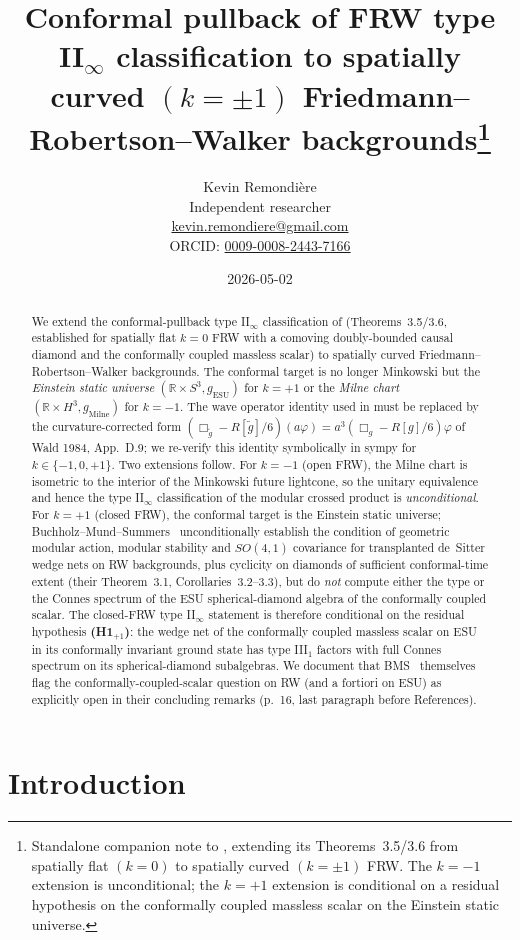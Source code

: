\documentclass[11pt]{article}
\title{Conformal pullback of FRW type II$_\infty$ classification to spatially
curved $(k=\pm 1)$ Friedmann--Robertson--Walker
backgrounds\thanks{Standalone companion note to \cite{Remondiere2026}, extending
its Theorems~3.5/3.6 from spatially flat $(k=0)$ to spatially curved
$(k=\pm 1)$ FRW. The $k=-1$ extension is unconditional; the $k=+1$ extension is
conditional on a residual hypothesis on the conformally coupled massless scalar
on the Einstein static universe.}}
\author{Kevin Remondi\`ere\\
\small Independent researcher\\
\small \href{mailto:kevin.remondiere@gmail.com}{kevin.remondiere@gmail.com}\\
\small ORCID: \href{https://orcid.org/0009-0008-2443-7166}{0009-0008-2443-7166}}
\date{2026-05-02}
\theoremstyle{definition}
\newcommand{\R}{\mathbb{R}}
\newcommand{\ESU}{\mathrm{ESU}}
\newcommand{\Milne}{\mathrm{Milne}}
\begin{document}
\maketitle

\begin{abstract}
We extend the conformal-pullback type II$_\infty$ classification of
\cite{Remondiere2026} (Theorems~3.5/3.6, established for spatially flat
$k=0$ FRW with a comoving doubly-bounded causal diamond and the conformally
coupled massless scalar) to spatially curved Friedmann--Robertson--Walker
backgrounds. The conformal target is no longer Minkowski but the
\emph{Einstein static universe} $(\R\times S^3,g_\ESU)$ for $k=+1$ or the
\emph{Milne chart} $(\R\times H^3,g_\Milne)$ for $k=-1$. The wave operator
identity used in \cite{Remondiere2026} must be replaced by the curvature-corrected
form $(\Box_{\tilde g}-R[\tilde g]/6)(a\varphi)=a^3(\Box_g-R[g]/6)\varphi$
of Wald 1984, App.~D.9; we re-verify this identity symbolically in sympy
for $k\in\{-1,0,+1\}$. Two extensions follow.
For $k=-1$ (open FRW), the Milne chart is isometric to the interior of the
Minkowski future lightcone, so the unitary equivalence and hence the type
II$_\infty$ classification of the modular crossed product is
\emph{unconditional}. For $k=+1$ (closed FRW), the conformal target is the
Einstein static universe; Buchholz--Mund--Summers~\cite{BMS2000}
unconditionally establish the condition of geometric modular action,
modular stability and $SO(4,1)$ covariance for transplanted
de~Sitter wedge nets on RW backgrounds, plus cyclicity on diamonds of
sufficient conformal-time extent (their Theorem~3.1, Corollaries~3.2--3.3),
but do \emph{not} compute either the type or the Connes spectrum of the
ESU spherical-diamond algebra of the conformally coupled scalar. The closed-FRW
type II$_\infty$ statement is therefore conditional on the residual hypothesis
\textbf{(H1$_{+1}$)}: the wedge net of the conformally coupled massless scalar on
ESU in its conformally invariant ground state has type III$_1$ factors with
full Connes spectrum on its spherical-diamond subalgebras. We document that
BMS~\cite{BMS2000} themselves flag the conformally-coupled-scalar question on
RW (and a fortiori on ESU) as explicitly open in their concluding remarks
(p.~16, last paragraph before References).
\end{abstract}

\section{Introduction}\label{sec:intro}
\end{document}
